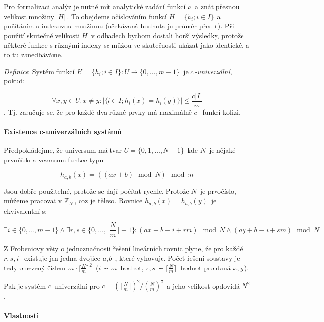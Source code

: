 Pro formalizaci analýz je nutné mít analytické zadání funkcí \(h\,\!\) a
znát přesnou velikost množiny \(|H|\,\!\). To obejdeme očíslováním
funkcí \(H = \{ h_i; i\in I \}\,\!\) a počítáním s indexovou množinou
(očekávaná hodnota je průměr přes \(I\,\!\)). Při použití skutečné
velikosti \(H\,\!\) v odhadech bychom dostali horší výsledky, protože
některé funkce s různými indexy se můžou ve skutečnosti ukázat jako
identické, a to tu zanedbáváme.

\emph{Definice}: Systém funkcí
\(H = \{ h_i; i \in I\}: U\to \{0,\dots,m-1\}\,\!\) je
\(c\,\!\)\emph{-univerzální}, pokud:

\[\forall x,y\in U, x\neq y: |\{i\in I; h_i(x)=h_i(y)\}|\leq \frac{c|I|}{m}\,\!\].
Tj. zaručuje se, že pro každé dva různé prvky má maximálně \(c\,\;\)
funkcí kolizi.

\paragraph{Existence c-univerzálních
systémů}\label{existence-c-univerzuxe1lnuxedch-systuxe9mux16f}

Předpokládejme, že universum má tvar \(U=\{0,1,\dots,N-1\}\,\!\) kde
\(N\,\!\) je nějaké prvočíslo a vezmeme funkce typu

\[h_{a,b}(x)=((ax + b) \mod N)\mod m\,\!\]

Jsou dobře použitelné, protože se dají počítat rychle. Protože \(N\,\!\)
je prvočíslo, můžeme pracovat v \(\mathbb{Z}_N\,\!\), coz je těleso.
Rovnice \(h_{a,b}(x)=h_{a,b}(y)\,\!\) je ekvivalentní s:

\[\exists i\in\{0,\dots,m-1\} \wedge \exists r,s\in\{0,\dots,\lceil\frac{N}{m}\rceil -1\} : (ax + b \equiv i + rm) \mod N \wedge (ay+ b \equiv i + sm) \mod N \,\!\]

Z Frobeniovy věty o jednoznačnosti řešení lineárních rovnic plyne, že
pro každé \(r,s,i\,\;\) existuje jen jedna dvojice \(a,b\,\;\), které
vyhovuje. Počet řešení soustavy je tedy omezený číslem
\(m\cdot\lceil\frac{N}{m}\rceil^2\,\!\) (\(i\,\!\) -\/- \(m\,\!\)
hodnot, \(r,s\,\!\) -\/- \(\lceil\frac{N}{m}\rceil\,\!\) hodnot pro daná
\(x,y\,\!\)).

Pak je systém \(c\,\!\)-univerzální pro
\(c = \left(\lceil\frac{N}{m}\rceil\right)^2 / \left(\frac{N}{m}\right)^2\,\!\)
a jeho velikost opdovídá \(N^2\,\!\).

\paragraph{Vlastnosti}\label{vlastnosti}

